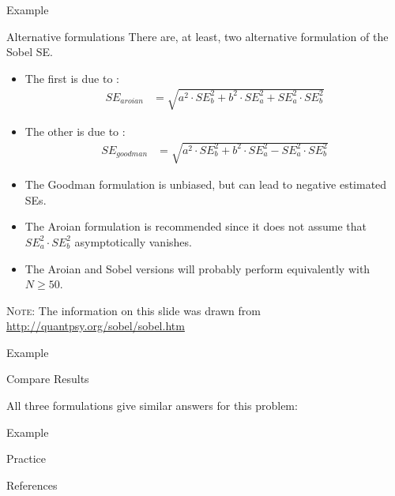 \documentclass{beamer}
\newcommand{\vb}[0]{\vspace{6pt}}
\newcommand{\vc}[0]{\vspace{3pt}}
\begin{document}
\begin{frame}{Example}



\end{frame}


\begin{frame}[shrink = 5]{Alternative formulations}
  There are, at least, two alternative formulation of the Sobel SE.
  \vb
  \begin{itemize}
  \item The first is due to \citet{aroian:1947}:
    \begin{align}
      SE_{aroian} &= \sqrt{a^2 \cdot SE_b^2 + b^2 \cdot SE_a^2 + SE_a^2 \cdot SE_b^2}
    \end{align}
  \item The other is due to \citet{goodman:1960}:
    \begin{align}
      SE_{goodman} &= \sqrt{a^2 \cdot SE_b^2 + b^2 \cdot SE_a^2 - SE_a^2 \cdot SE_b^2}
    \end{align}
  \item The Goodman formulation is unbiased, but can lead to negative
    estimated SEs.
    \vb
  \item The Aroian formulation is recommended since it does
    not assume that $SE_a^2 \cdot SE_b^2$ asymptotically vanishes.
    \vb
  \item The Aroian and Sobel versions will probably perform
    equivalently with $N \geq 50$.
  \end{itemize}
  \vb
  \tiny{\textsc{Note:} The information on this slide was drawn from
  \url{http://quantpsy.org/sobel/sobel.htm}}
\end{frame}


\begin{frame}[allowframebreaks]{Example}



\pagebreak



\end{frame}


\begin{frame}{Compare Results}

  All three formulations give similar answers for this problem:



\end{frame}


\begin{frame}[allowframebreaks]{Example}



\end{frame}


\begin{frame}{Practice}





\end{frame}


\begin{frame}{References}


\end{frame}
\end{document}
